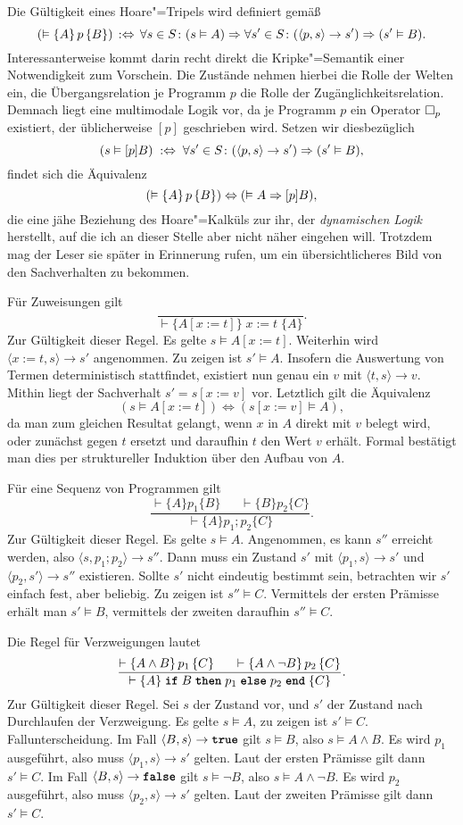 Die Gültigkeit eines Hoare"=Tripels wird definiert gemäß
\[(\vDash\{A\}\,p\,\{B\})\,:\Leftrightarrow\,
\forall s\in S\colon (s\vDash A)\Rightarrow\forall s'\in S\colon
(\langle p,s\rangle\to s')\Rightarrow (s'\vDash B).\]
Interessanterweise kommt darin recht direkt die Kripke"=Semantik einer
Notwendigkeit zum Vorschein. Die Zustände nehmen hierbei die Rolle der
Welten ein, die Übergangsrelation je Programm $p$ die Rolle der
Zugänglichkeitsrelation. Demnach liegt eine multimodale Logik vor, da je
Programm $p$ ein Operator $\Box_p$ existiert, der üblicherweise $[p]$
geschrieben wird. Setzen wir diesbezüglich
\[(s\vDash [p]B)\;:\Leftrightarrow\;\forall s'\in S\colon
(\langle p,s\rangle\to s')\Rightarrow (s'\vDash B),\]
findet sich die Äquivalenz
\[(\vDash\{A\}\,p\,\{B\})\Leftrightarrow (\vDash A\Rightarrow [p]B),\]
die eine jähe Beziehung des Hoare"=Kalküls zur ihr, der \emph{dynamischen Logik} herstellt, auf
die ich an dieser Stelle aber nicht näher eingehen will. Trotzdem mag der
Leser sie später in Erinnerung rufen, um ein übersichtlicheres Bild
von den Sachverhalten zu bekommen.

 Für Zuweisungen gilt
\[\dfrac{}{\vdash\{A[x:=t]\}\; x := t\;\{A\}}.\]
Zur Gültigkeit dieser Regel. Es gelte $s\models A[x:=t]$. Weiterhin
wird $\langle x:=t,s\rangle\to s'$ angenommen. Zu zeigen ist $s'\models A$.
Insofern die Auswertung von Termen deterministisch stattfindet, existiert
nun genau ein $v$ mit $\langle t,s\rangle\to v$. Mithin liegt der
Sachverhalt $s'=s[x:=v]$ vor. Letztlich gilt die Äquivalenz
\[(s\models A[x:=t])\Leftrightarrow (s[x:=v]\models A),\]
da man zum gleichen Resultat gelangt, wenn $x$ in $A$ direkt mit $v$
belegt wird, oder zunächst gegen $t$ ersetzt und daraufhin $t$ den
Wert $v$ erhält. Formal bestätigt man dies per struktureller
Induktion über den Aufbau von $A$.

Für eine Sequenz von Programmen gilt
\[\dfrac{\vdash\{A\}p_1\{B\}\quad\;\;\vdash\{B\}p_2\{C\}}{\vdash\{A\}p_1; p_2\{C\}}.\]
Zur Gültigkeit dieser Regel. Es gelte $s\models A$. Angenommen,
es kann $s''$ erreicht werden, also $\langle s,p_1; p_2\rangle\to s''$.
Dann muss ein Zustand $s'$ mit $\langle p_1,s\rangle\to s'$ und
$\langle p_2,s'\rangle\to s''$ existieren. Sollte $s'$ nicht eindeutig
bestimmt sein, betrachten wir $s'$ einfach fest, aber beliebig. Zu zeigen
ist $s''\models C$. Vermittels der ersten Prämisse erhält man
$s'\models B$, vermittels der zweiten daraufhin $s''\models C$.

Die Regel für Verzweigungen lautet
\[\dfrac{\vdash\{A\land B\}\,p_1\,\{C\}\quad\;\;\vdash\{A\land\lnot B\}\,p_2\,\{C\}}
{\vdash\{A\}\;\kw{if}\;B\;\kw{then}\;p_1\;\kw{else}\;p_2\;\kw{end}\;\{C\}}.\]
Zur Gültigkeit dieser Regel. Sei $s$ der Zustand vor, und $s'$ der
Zustand nach Durchlaufen der Verzweigung. Es gelte $s\models A$, zu
zeigen ist $s'\models C$. Fallunterscheidung. Im Fall
$\langle B,s\rangle\to\kw{true}$
gilt $s\models B$, also $s\models A\land B$. Es wird $p_1$ ausgeführt,
also muss $\langle p_1,s\rangle\to s'$ gelten. Laut der ersten Prämisse
gilt dann $s'\models C$. Im Fall $\langle B,s\rangle\to\kw{false}$
gilt $s\models\lnot B$, also $s\models A\land\lnot B$. Es wird $p_2$
ausgeführt, also muss $\langle p_2,s\rangle\to s'$ gelten. Laut der
zweiten Prämisse gilt dann $s'\models C$.

